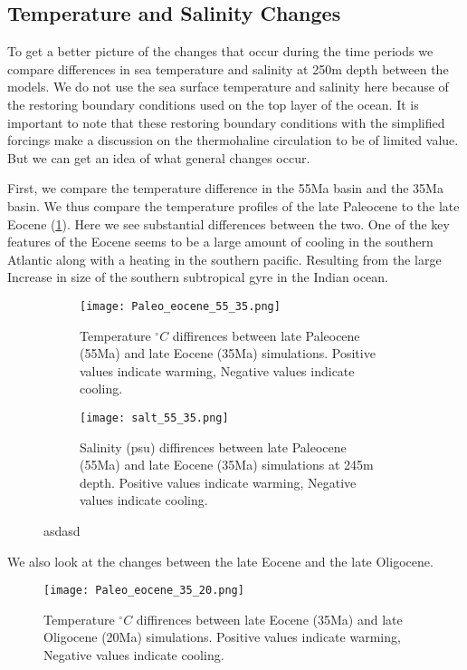 \subsection{Temperature and Salinity Changes}
To get a better picture of the changes that occur during the time periods we compare differences in sea temperature and salinity at 250m depth between the models. We do not use the sea surface temperature and salinity here because of the restoring boundary conditions used on the top layer of the ocean. It is important to note that these restoring boundary conditions with the simplified forcings make a discussion on the thermohaline circulation to be of limited value. But we can get an idea of what general changes occur.

First, we compare the temperature difference in the 55Ma basin and the 35Ma basin. We thus compare the temperature profiles of the late Paleocene to the late Eocene (\cref{fig:5535cooling}). Here we see substantial differences between the two. One of the key features of the Eocene seems to be a large amount of cooling in the southern Atlantic along with a heating in the southern pacific. Resulting from the large Increase in size of the southern subtropical gyre in the Indian ocean. 

\begin{figure}[H]
	\begin{subfigure}{\linewidth}
			\texttt{[image: Paleo\_eocene\_55\_35.png]}
		\caption{Temperature $^{\circ}C$ diffirences between late Paleocene (55Ma) and late Eocene (35Ma) simulations. Positive values indicate warming, Negative values indicate cooling.}
		\label{fig:5535cooling}
	\end{subfigure}
	\begin{figure}{\linewidth}
		\texttt{[image: salt\_55\_35.png]}
		\caption{Salinity (psu) diffirences between late Paleocene (55Ma) and late Eocene (35Ma) simulations at 245m depth. Positive values indicate warming, Negative values indicate cooling.}
		\label{fig:salt5535cooling}
	\end{figure}
	\caption{asdasd}
\end{figure}


We also look at the changes between the late Eocene and the late Oligocene. 

\begin{figure}[H]
	\texttt{[image: Paleo\_eocene\_35\_20.png]}
	\caption{Temperature $^{\circ}C$ diffirences between late Eocene (35Ma) and late Oligocene (20Ma) simulations. Positive values indicate warming, Negative values indicate cooling.}
	\label{fig:3520cooling}
\end{figure}

